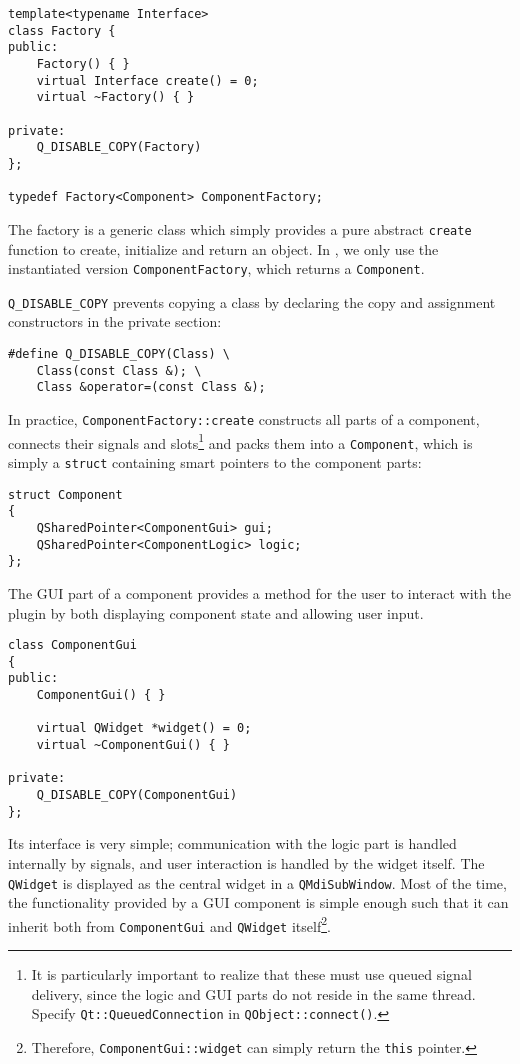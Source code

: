 \begin{lstlisting}
template<typename Interface>
class Factory {
public:
    Factory() { }
    virtual Interface create() = 0;
    virtual ~Factory() { }

private:
    Q_DISABLE_COPY(Factory)
};

typedef Factory<Component> ComponentFactory;
\end{lstlisting}

The factory is a generic class which simply provides a pure abstract \lstinline|create| function
to create, initialize and return an object. In \qsimavr, we only use the instantiated
version \lstinline|ComponentFactory|, which returns a \lstinline|Component|.

\lstinline|Q_DISABLE_COPY| prevents copying a class by declaring the copy and
assignment constructors in the private section:

\begin{lstlisting}
#define Q_DISABLE_COPY(Class) \
    Class(const Class &); \
    Class &operator=(const Class &);
\end{lstlisting}

In practice, \lstinline|ComponentFactory::create| constructs all parts of a component, connects
their signals and slots\footnote{
%
It is particularly important to realize that these must use queued signal
delivery, since the logic and \ac{GUI} parts do not reside in the same thread.
Specify \lstinline|Qt::QueuedConnection| in \lstinline|QObject::connect()|.
%
} and packs them into a \lstinline|Component|, which is simply a \lstinline|struct| containing
smart pointers to the component parts:

\begin{lstlisting}
struct Component
{
    QSharedPointer<ComponentGui> gui;
    QSharedPointer<ComponentLogic> logic;
};
\end{lstlisting}

The \ac{GUI} part of a component provides a method for the user to interact with
the plugin by both displaying component state and allowing user input.

\begin{lstlisting}
class ComponentGui
{
public:
    ComponentGui() { }

    virtual QWidget *widget() = 0;
    virtual ~ComponentGui() { }

private:
    Q_DISABLE_COPY(ComponentGui)
};
\end{lstlisting}

Its interface is very simple; communication with the logic part is handled internally
by signals, and user interaction is handled by the widget itself. The
\lstinline|QWidget| is displayed as the central widget in a \lstinline|QMdiSubWindow|.
Most of the time, the functionality provided by a \ac{GUI} component is simple enough
such that it can inherit both from \lstinline|ComponentGui| and \lstinline|QWidget|
itself\footnote{
%
Therefore, \lstinline|ComponentGui::widget| can simply return the
\lstinline|this| pointer.
%
}.

